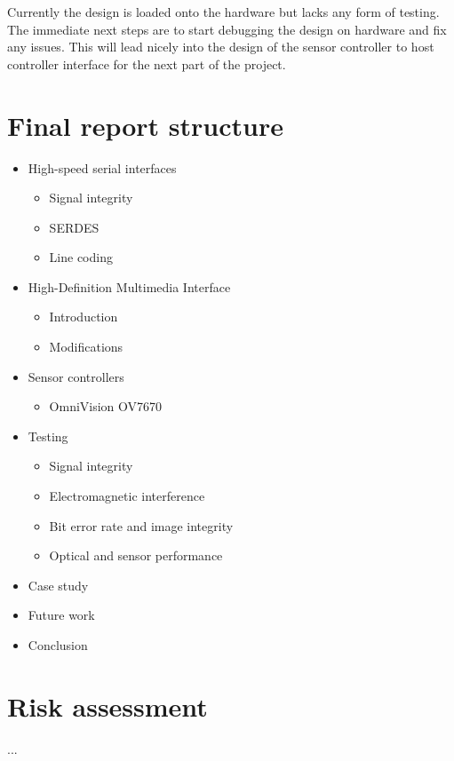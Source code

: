 \documentclass[a4paper]{report}
\begin{document}
Currently the design is loaded onto the hardware but lacks any form of testing. The immediate next steps are to start debugging the design on hardware and fix any issues. This will lead nicely into the design of the sensor controller to host controller interface for the next part of the project.

\chapter{Final report structure}

\begin{itemize}
  \item High-speed serial interfaces
  \begin{itemize}
    \item Signal integrity
    \item SERDES
    \item Line coding
  \end{itemize}
  \item High-Definition Multimedia Interface
  \begin{itemize}
  \item Introduction
    \item Modifications
  \end{itemize}
  \item Sensor controllers
  \begin{itemize}
  \item OmniVision OV7670
  \end{itemize}
  \item Testing
  \begin{itemize}
  \item Signal integrity
    \item Electromagnetic interference
    \item Bit error rate and image integrity
    \item Optical and sensor performance
  \end{itemize}
  \item Case study
  \item Future work
  \item Conclusion
\end{itemize}

\chapter{Risk assessment}

...
\end{document}
